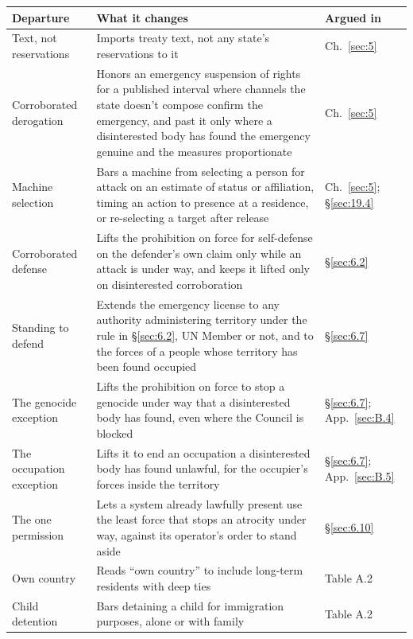 \begingroup\small\renewcommand{\arraystretch}{1.12}
\begin{longtable}{@{}>{\raggedright\arraybackslash}p{}>{\raggedright\arraybackslash}p{}>{\raggedright\arraybackslash}p{}@{}}
\hline
\textbf{Departure} & \textbf{What it changes} & \textbf{Argued in} \\
\hline
\endhead
Text, not reservations & Imports treaty text, not any state's reservations to it & Ch.~\ref{sec:5} \\ \hline
Corroborated derogation & Honors an emergency suspension of rights for a published interval where channels the state doesn't compose confirm the emergency, and past it only where a disinterested body has found the emergency genuine and the measures proportionate & Ch.~\ref{sec:5} \\ \hline
Machine selection & Bars a machine from selecting a person for attack on an estimate of status or affiliation, timing an action to presence at a residence, or re-selecting a target after release & Ch.~\ref{sec:5}; \S\ref{sec:19.4} \\ \hline
Corroborated defense & Lifts the prohibition on force for self-defense on the defender's own claim only while an attack is under way, and keeps it lifted only on disinterested corroboration & \S\ref{sec:6.2} \\ \hline
Standing to defend & Extends the emergency license to any authority administering territory under the rule in \S\ref{sec:6.2}, UN Member or not, and to the forces of a people whose territory has been found occupied & \S\ref{sec:6.7} \\ \hline
The genocide exception & Lifts the prohibition on force to stop a genocide under way that a disinterested body has found, even where the Council is blocked & \S\ref{sec:6.7}; App.~\ref{sec:B.4} \\ \hline
The occupation exception & Lifts it to end an occupation a disinterested body has found unlawful, for the occupier's forces inside the territory & \S\ref{sec:6.7}; App.~\ref{sec:B.5} \\ \hline
The one permission & Lets a system already lawfully present use the least force that stops an atrocity under way, against its operator's order to stand aside & \S\ref{sec:6.10} \\ \hline
Own country & Reads “own country” to include long-term residents with deep ties & Table A.2 \\ \hline
Child detention & Bars detaining a child for immigration purposes, alone or with family & Table A.2 \\ \hline
\end{longtable}
\endgroup

